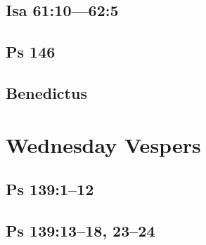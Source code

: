 {%
\parindent 0pt
\noindent
\ifx\preLilyPondExample \undefined
\else
  \expandafter\preLilyPondExample
\fi
\def\lilypondbook{}%

\ifx\postLilyPondExample \undefined
\else
  \expandafter\postLilyPondExample
\fi
}

\subsection{Isa 61:10—62:5}

{%
\parindent 0pt
\noindent
\ifx\preLilyPondExample \undefined
\else
  \expandafter\preLilyPondExample
\fi
\def\lilypondbook{}%

\ifx\postLilyPondExample \undefined
\else
  \expandafter\postLilyPondExample
\fi
}

\subsection{Ps 146}

{%
\parindent 0pt
\noindent
\ifx\preLilyPondExample \undefined
\else
  \expandafter\preLilyPondExample
\fi
\def\lilypondbook{}%

\ifx\postLilyPondExample \undefined
\else
  \expandafter\postLilyPondExample
\fi
}

\subsection{Benedictus}

{%
\parindent 0pt
\noindent
\ifx\preLilyPondExample \undefined
\else
  \expandafter\preLilyPondExample
\fi
\def\lilypondbook{}%

\ifx\postLilyPondExample \undefined
\else
  \expandafter\postLilyPondExample
\fi
}


\section{Wednesday Vespers}

\subsection{Ps 139:1--12}

{%
\parindent 0pt
\noindent
\ifx\preLilyPondExample \undefined
\else
  \expandafter\preLilyPondExample
\fi
\def\lilypondbook{}%

\ifx\postLilyPondExample \undefined
\else
  \expandafter\postLilyPondExample
\fi
}

\subsection{Ps 139:13--18, 23--24}

